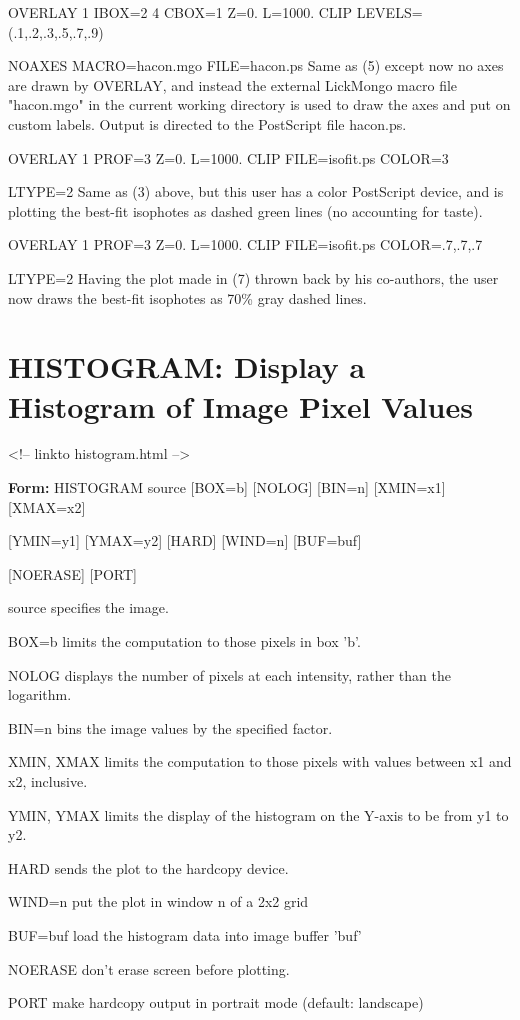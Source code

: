 \begin{example}
  \item[OVERLAY 1 IBOX=2 4 CBOX=1 Z=0. L=1000. 
        CLIP LEVELS=(.1,.2,.3,.5,.7,.9)\hfill]{}
  \item[NOAXES MACRO=hacon.mgo FILE=hacon.ps\hfill]{
   Same as (5) except now no axes are drawn by OVERLAY, and instead the
   external LickMongo macro file "hacon.mgo" in the current working 
   directory is used to draw the axes and put on custom labels.  Output
   is directed to the PostScript file hacon.ps.}
  \item[OVERLAY 1 PROF=3 Z=0. L=1000. CLIP FILE=isofit.ps COLOR=3\hfill]{}
  \item[LTYPE=2\hfill]{
   Same as (3) above, but this user has a color PostScript device, and
   is plotting the best-fit isophotes as dashed green lines (no accounting
   for taste).  }
  \item[OVERLAY 1 PROF=3 Z=0. L=1000. CLIP FILE=isofit.ps 
        COLOR=.7,.7,.7\hfill]{} 
  \item[LTYPE=2\hfill]{
   Having the plot made in (7) thrown back by his co-authors, the user
   now draws the best-fit isophotes as 70\% gray dashed lines.}
\end{example}

\section{HISTOGRAM: Display a Histogram of Image Pixel Values}
\begin{rawhtml}
<!-- linkto histogram.html -->
\end{rawhtml}
\begin{command}
  \item[\textbf{Form:}   HISTOGRAM source {[BOX=b]} {[NOLOG]} {[BIN=n]} {[XMIN=x1]} {[XMAX=x2]}\hfill]{}
  \item{{[YMIN=y1]} {[YMAX=y2]} {[HARD]} {[WIND=n]} {[BUF=buf]}}
  \item{{[NOERASE]} {[PORT]}}
  \item[source\hfill]{   specifies the image.}
  \item[BOX=b\hfill]{limits the computation to those pixels in box 'b'.}
  \item[NOLOG\hfill]{displays the number of pixels at each intensity,
rather than the logarithm.}
  \item[BIN=n\hfill]{   bins the image values by the specified factor.}
  \item[XMIN, XMAX\hfill]{  limits the computation to those pixels with values
between x1 and x2, inclusive.}
  \item[YMIN, YMAX   \hfill]{   limits the display of the histogram on the Y-axis
to be from y1 to y2.}
  \item[HARD\hfill]{sends the plot to the hardcopy device.}
  \item[WIND=n\hfill]{put the plot in window n of a 2x2 grid}
  \item[BUF=buf\hfill]{  load the histogram data into image buffer 'buf'}
  \item[   NOERASE   \hfill]{don't erase screen before plotting.}
  \item[PORT\hfill]{make hardcopy output in portrait mode (default: landscape)}
\end{command}

